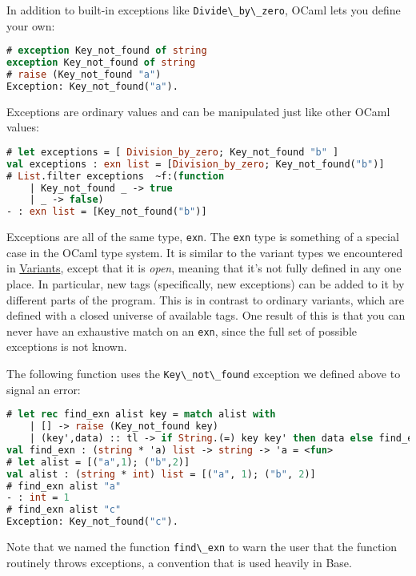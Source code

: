 In addition to built-in exceptions like
\passthrough{\lstinline!Divide\_by\_zero!}, OCaml lets you define your
own:

\begin{lstlisting}[language=Caml]
# exception Key_not_found of string
exception Key_not_found of string
# raise (Key_not_found "a")
Exception: Key_not_found("a").
\end{lstlisting}

Exceptions are ordinary values and can be manipulated just like other
OCaml values:

\begin{lstlisting}[language=Caml]
# let exceptions = [ Division_by_zero; Key_not_found "b" ]
val exceptions : exn list = [Division_by_zero; Key_not_found("b")]
# List.filter exceptions  ~f:(function
    | Key_not_found _ -> true
    | _ -> false)
- : exn list = [Key_not_found("b")]
\end{lstlisting}

Exceptions are all of the same type, \passthrough{\lstinline!exn!}. The
\passthrough{\lstinline!exn!} type is something of a special case in the
OCaml type system. It is similar to the variant types we encountered in
\href{variants.html\#variants}{Variants}, except that it is \emph{open},
meaning that it's not fully defined in any one place. In particular, new
tags (specifically, new exceptions) can be added to it by different
parts of the program. This is in contrast to ordinary variants, which
are defined with a closed universe of available tags. One result of this
is that you can never have an exhaustive match on an
\passthrough{\lstinline!exn!}, since the full set of possible exceptions
is not known.

The following function uses the
\passthrough{\lstinline!Key\_not\_found!} exception we defined above to
signal an error:

\begin{lstlisting}[language=Caml]
# let rec find_exn alist key = match alist with
    | [] -> raise (Key_not_found key)
    | (key',data) :: tl -> if String.(=) key key' then data else find_exn tl key
val find_exn : (string * 'a) list -> string -> 'a = <fun>
# let alist = [("a",1); ("b",2)]
val alist : (string * int) list = [("a", 1); ("b", 2)]
# find_exn alist "a"
- : int = 1
# find_exn alist "c"
Exception: Key_not_found("c").
\end{lstlisting}

Note that we named the function \passthrough{\lstinline!find\_exn!} to
warn the user that the function routinely throws exceptions, a
convention that is used heavily in
Base.

